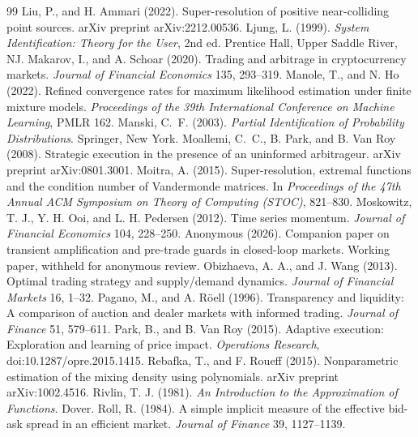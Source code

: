 \documentclass[12pt]{article}
\theoremstyle{definition}
\theoremstyle{remark}
\begin{document}
\begin{thebibliography}{99}
 Liu, P., and H. Ammari (2022). Super-resolution of positive near-colliding point sources. arXiv preprint arXiv:2212.00536.
 Ljung, L. (1999). \emph{System Identification: Theory for the User}, 2nd ed. Prentice Hall, Upper Saddle River, NJ.
 Makarov, I., and A. Schoar (2020). Trading and arbitrage in cryptocurrency markets. \emph{Journal of Financial Economics} 135, 293--319.
 Manole, T., and N. Ho (2022). Refined convergence rates for maximum likelihood estimation under finite mixture models. \emph{Proceedings of the 39th International Conference on Machine Learning}, PMLR 162.
 Manski, C.~F. (2003). \emph{Partial Identification of Probability Distributions}. Springer, New York.
 Moallemi, C.~C., B. Park, and B. Van Roy (2008). Strategic execution in the presence of an uninformed arbitrageur. arXiv preprint arXiv:0801.3001.
 Moitra, A. (2015). Super-resolution, extremal functions and the condition number of Vandermonde matrices. In \emph{Proceedings of the 47th Annual ACM Symposium on Theory of Computing (STOC)}, 821--830.
 Moskowitz, T. J., Y. H. Ooi, and L. H. Pedersen (2012). Time series momentum. \emph{Journal of Financial Economics} 104, 228--250.
 Anonymous (2026). Companion paper on transient amplification and pre-trade guards in closed-loop markets. Working paper, withheld for anonymous review.
 Obizhaeva, A. A., and J. Wang (2013). Optimal trading strategy and supply/demand dynamics. \emph{Journal of Financial Markets} 16, 1--32.
 Pagano, M., and A. R\"oell (1996). Transparency and liquidity: A comparison of auction and dealer markets with informed trading. \emph{Journal of Finance} 51, 579--611.
 Park, B., and B. Van Roy (2015). Adaptive execution: Exploration and learning of price impact. \emph{Operations Research}, doi:10.1287/opre.2015.1415.
 Rebafka, T., and F. Roueff (2015). Nonparametric estimation of the mixing density using polynomials. arXiv preprint arXiv:1002.4516.
 Rivlin, T. J. (1981). \emph{An Introduction to the Approximation of Functions}. Dover.
 Roll, R. (1984). A simple implicit measure of the effective bid-ask spread in an efficient market. \emph{Journal of Finance} 39, 1127--1139.

\end{thebibliography}
\end{document}
